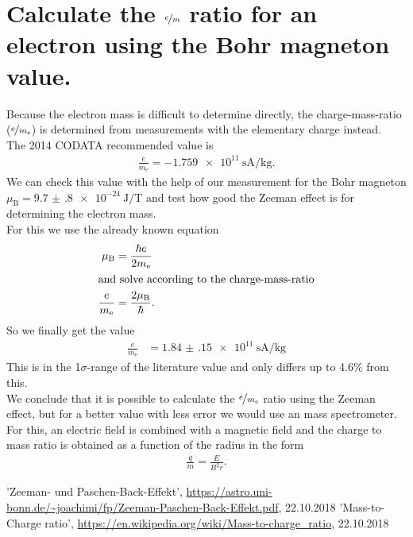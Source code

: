 \documentclass[12pt,
				 a4paper,
				 ]{scrartcl}
\begin{document}
\section*{Calculate the $\nicefrac{e}{m}$ ratio for an electron using the Bohr magneton value.}
Because the electron mass is difficult to determine directly, the charge-mass-ratio ($\nicefrac{e}{m_\text{e}}$) is determined from measurements with the elementary charge instead.\\
The 2014 CODATA recommended value is
\begin{align*}
\frac{e}{m_\text{e}}=\SI{-1.759e11}{\second\ampere\per\kilo\gram}.
\end{align*}
We can check this value with the help of our measurement for the Bohr magneton $\mu_\text{B}=\SI{9.7(8)e-24}{\joule\per\tesla}$ and test how good the Zeeman effect is for determining the electron mass.\\
For this we use the already known equation
\begin{align}
\mu_\text{B}&=\frac{\hbar e}{2m_\text{e}}\\
\intertext{and solve according to the charge-mass-ratio}
\frac{e}{m_\text{e}}&=\frac{2\mu_\text{B}}{\hbar}.
\end{align}
So we finally get the value
\begin{align*}\frac{e}{m_\text{e}}&=\SI{1.84(15)e11}{\second\ampere\per\kilo\gram}
\end{align*}
This is in the 1$\sigma$-range of the literature value and only differs up to 4.6\% from this.\\
We conclude that it is possible to calculate the $\nicefrac{e}{m_\text{e}}$ ratio using the Zeeman effect, but for a better value with less error we would use an mass spectrometer.
For this, an electric field is combined with a magnetic field and the charge to mass ratio is obtained as a function of the radius in the form
\begin{align}
\frac{q}{m}=\frac{E}{B^2r}.
\end{align}

\begin{thebibliography}{}
\bibitem{}'Zeeman- und Paschen-Back-Effekt', \url{https://astro.uni-bonn.de/~joachimi/fp/Zeeman-Paschen-Back-Effekt.pdf}, 22.10.2018
\bibitem{}'Mass-to-Charge ratio', \url{https://en.wikipedia.org/wiki/Mass-to-charge_ratio}, 22.10.2018
\end{thebibliography}
\end{document}
